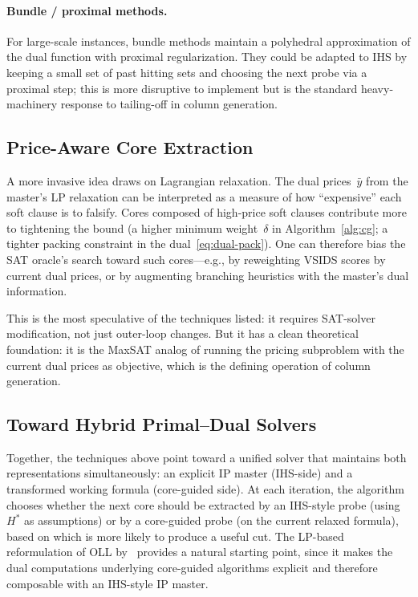 \documentclass[11pt,a4paper]{article}
\begin{document}
\paragraph{Bundle / proximal methods.}
For large-scale instances, bundle methods maintain a polyhedral approximation
of the dual function with proximal regularization. They could be adapted to
IHS by keeping a small set of past hitting sets and choosing the next probe
via a proximal step; this is more disruptive to implement but is the standard
heavy-machinery response to tailing-off in column generation.

\subsection{Price-Aware Core Extraction}

A more invasive idea draws on Lagrangian relaxation. The dual prices~$\bar{y}$
from the master's LP relaxation can be interpreted as a measure of how
``expensive'' each soft clause is to falsify. Cores composed of high-price
soft clauses contribute more to tightening the bound (a higher minimum
weight~$\delta$ in Algorithm~\ref{alg:cg}; a tighter packing constraint in
the dual~\eqref{eq:dual-pack}). One can therefore bias the SAT oracle's
search toward such cores---e.g., by reweighting VSIDS scores by current dual
prices, or by augmenting branching heuristics with the master's dual
information.

This is the most speculative of the techniques listed: it requires
SAT-solver modification, not just outer-loop changes. But it has a clean
theoretical foundation: it is the MaxSAT analog of running the pricing
subproblem with the current dual prices as objective, which is the defining
operation of column generation.

\subsection{Toward Hybrid Primal--Dual Solvers}

Together, the techniques above point toward a unified solver that maintains
both representations simultaneously: an explicit IP master (IHS-side) and a
transformed working formula (core-guided side). At each iteration, the
algorithm chooses whether the next core should be extracted by an IHS-style
probe (using $H^*$ as assumptions) or by a core-guided probe (on the current
relaxed formula), based on which is more likely to produce a useful cut. The
LP-based reformulation of OLL by~\citet{katsirelos2025core} provides a
natural starting point, since it makes the dual computations underlying
core-guided algorithms explicit and therefore composable with an IHS-style
IP master.
\end{document}
